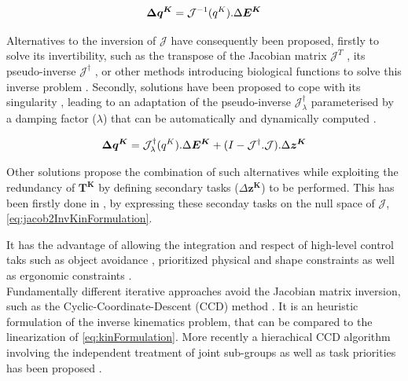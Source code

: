 \begin{equation}
	\boldsymbol{\Delta q^K} = \mathcal{J}^{-1}(q^K) . \Delta\boldsymbol{E^K}
\label{eq:jacobInvKinFormulation}
\eqcaption{Jacobian-based inverse kinematics formulation}
\end{equation}

Alternatives to the inversion of $\mathcal{J}$ have consequently been proposed, firstly to solve its invertibility, such as the transpose of the Jacobian matrix $\mathcal{J}^{T}$ , its pseudo-inverse $\mathcal{J}^{\dag}$ , or other methods introducing biological functions to solve this inverse problem . Secondly, solutions have been proposed to cope with its singularity , leading to an adaptation of the pseudo-inverse $\mathcal{J}^{\dag}_{\lambda}$ parameterised by a damping factor ($\lambda$) that can be automatically and dynamically computed .

\begin{equation}
	\boldsymbol{\Delta q^K} = \mathcal{J}^{\dag}_{\lambda}(q^K) . \Delta\boldsymbol{E^K} + (I - \mathcal{J}^{\dag} . \mathcal{J}) . \Delta \boldsymbol{z^K}
\label{eq:jacob2InvKinFormulation}
\eqcaption{Jacobian-based inverse kinematics formulation, secondary tasks}
\end{equation}

Other solutions propose the combination of such alternatives while exploiting the redundancy of $\boldsymbol{T^K}$ by defining secondary tasks ($\Delta \boldsymbol{z^K}$) to be performed. This has been firstly done in , by expressing these seconday tasks on the null space of $\mathcal{J}$, \myequname \eqref{eq:jacob2InvKinFormulation}.

It has the advantage of allowing the integration and respect of high-level control taks such as object avoidance , prioritized physical and shape constraints  as well as ergonomic constraints .\\



Fundamentally different iterative approaches avoid the Jacobian matrix inversion, such as the Cyclic-Coordinate-Descent (CCD) method . It is an heuristic formulation of the inverse kinematics problem, that can be compared to the linearization of \myequname \eqref{eq:kinFormulation}. More recently a hierachical CCD algorithm involving the independent treatment of joint sub-groups as well as task priorities has been proposed . %

